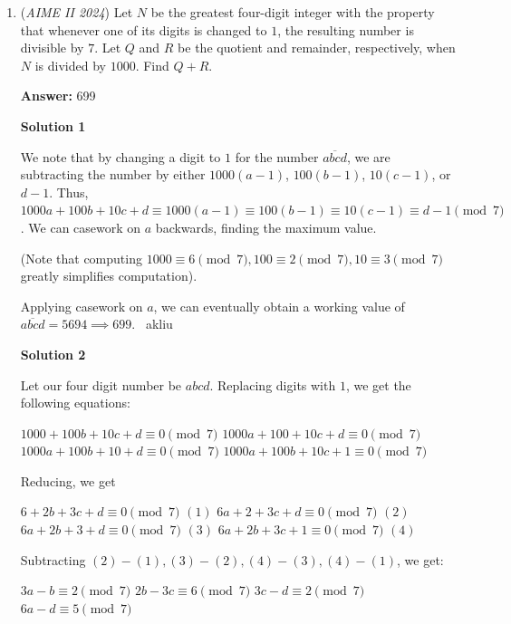 \begin{enumerate}
 Now, the problem becomes writing 4048 in base 2, say, $4048 = \left( \cdots b_2b_1b_0 \right)_2$.We have $A = \left\{ j \geq 1: b_j = 1 \right\}$.

 We have $4048 = \left( 111,111,010,000 \right)_2$.Therefore, $A = \left\{ 4, 6, 7, 8, 9, 10, 11 \right\}$.Therefore, the sum of all elements in $A$ is $\boxed{\textbf{(55) }}$.

 


	\item (\textit{AIME II 2024}) Let $N$ be the greatest four-digit integer with the property that whenever one of its digits is changed to $1$, the resulting number is divisible by $7$. Let $Q$ and $R$ be the quotient and remainder, respectively, when $N$ is divided by $1000$. Find $Q+R$.


 
 \textbf{Answer: }699



\textbf{Solution 1}

We note that by changing a digit to $1$ for the number $\overline{abcd}$, we are subtracting the number by either $1000(a-1)$, $100(b-1)$, $10(c-1)$, or $d-1$. Thus, $1000a + 100b + 10c + d \equiv 1000(a-1) \equiv 100(b-1) \equiv 10(c-1) \equiv d-1 \pmod{7}$. We can casework on $a$ backwards, finding the maximum value.

 (Note that computing $1000 \equiv 6 \pmod{7}, 100 \equiv 2 \pmod{7}, 10 \equiv 3 \pmod{7}$ greatly simplifies computation).

 Applying casework on $a$, we can eventually obtain a working value of $\overline{abcd} = 5694 \implies \boxed{699}$. ~akliu

 



\textbf{Solution 2}

Let our four digit number be $abcd$. Replacing digits with $1$, we get the following equations:

 $1000+100b+10c+d \equiv 0 \pmod{7}$
$1000a+100+10c+d \equiv 0 \pmod{7}$
$1000a+100b+10+d \equiv 0 \pmod{7}$
$1000a+100b+10c+1 \equiv 0 \pmod{7}$

 Reducing, we get

 $6+2b+3c+d \equiv 0 \pmod{7}$ $(1)$
$6a+2+3c+d \equiv 0 \pmod{7}$ $(2)$
$6a+2b+3+d \equiv 0 \pmod{7}$ $(3)$
$6a+2b+3c+1 \equiv 0 \pmod{7}$ $(4)$

 Subtracting $(2)-(1), (3)-(2), (4)-(3), (4)-(1)$, we get:

 $3a-b \equiv 2 \pmod{7}$
$2b-3c \equiv 6 \pmod{7}$
$3c-d \equiv 2 \pmod{7}$
$6a-d \equiv 5 \pmod{7}$


\end{enumerate}
